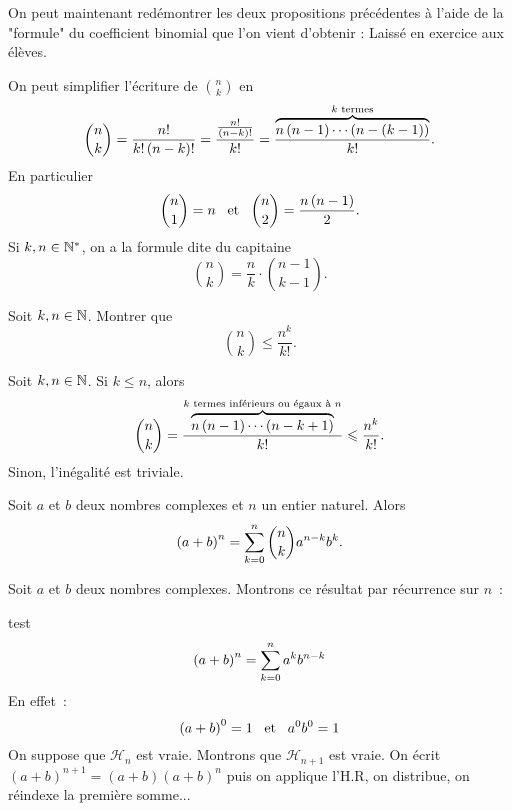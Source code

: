 \documentclass{magnoliaold}
\begin{document}
\begin{preuve}
On peut maintenant redémontrer les deux propositions précédentes à l'aide de la "formule" du coefficient binomial que l'on vient d'obtenir :
Laissé en exercice aux élèves.

\end{preuve}
\begin{remarques}
\remarque On peut simplifier l'écriture de $\binom{n}{k}$ en
  \[\binom{n}{k}=\frac{n!}{k!\left(n-k\right)!}=\frac{\frac{n!}{\left(n-k\right)!}}{k!}=
    \frac{\overbrace{n\left(n-1\right)\cdots\left(n-(k-1)\right)}^{\text{$k$ termes}}}{k!}.\]
  En particulier
  \[\binom{n}{1}=n \quad\!\text{et}\quad\! \binom{n}{2}=\frac{n\left(n-1\right)}{2}.\]
\remarque Si $k,n\in{\mathbb{N}^*}$, on a la formule dite \og du capitaine \fg
  \[\binom{n}{k}=\frac{n}{k}\cdot\binom{n-1}{k-1}.\]
\end{remarques}

\begin{exoUnique}
\exo Soit $k,n\in\mathbb{N}$. Montrer que
  \[\binom{n}{k}\leq\frac{n^k}{k!}.\]
  \begin{sol}
  Soit $k,n\in\mathbb{N}$. Si $k\leq n$, alors
  \[\binom{n}{k}=
    \frac{\overbrace{n\left(n-1\right)\cdots\left(n-k+1\right)}^{\text{$k$ termes inférieurs ou égaux à $n$}}}{k!}\leqslant \frac{n^k}{k!}.\]
  Sinon, l'inégalité est triviale.
  \end{sol}
\end{exoUnique}


\begin{proposition}[utile=3, nom=Binôme de \nom{Newton}]
Soit $a$ et $b$ deux nombres complexes et $n$ un entier naturel. Alors
\[\left(a+b\right)^n=\sum_{k=0}^n \binom{n}{k}a^{n-k} b^k.\]
\end{proposition}
\begin{preuve}
Soit $a$ et $b$ deux nombres complexes. Montrons ce résultat par récurrence
sur $n$~:
\begin{recurrence}
test $$\left(a+b\right)^n=\sum_{k=0}^n a^k b^{n-k}$$
\recinit En effet~:
  $$\left(a+b\right)^0=1 \quad\!\text{et}\quad\! a^0 b^0=1$$
\rechere On suppose que $\mathcal{H}_n$ est vraie. Montrons que
  $\mathcal{H}_{n+1}$ est vraie.
  On écrit $(a+b)^{n+1}=(a+b)(a+b)^n$ puis on applique l'H.R, on distribue, on réindexe la première somme...
\end{recurrence}
\end{preuve}
\end{document}
